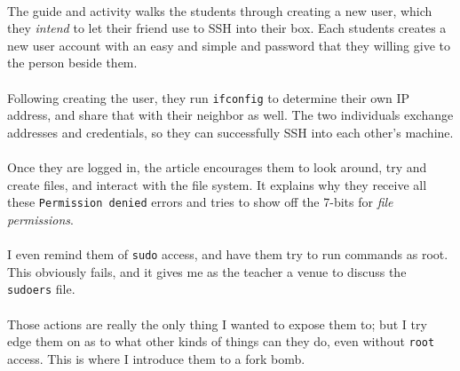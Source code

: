 \documentclass[11pt]{article}
\begin{document}
	\paragraph{} The guide and activity walks the students through creating a new user, which they \textit{intend} to let their friend use to SSH into their box. Each students creates a new user account with an easy and simple and password that they willing give to the person beside them.

	\paragraph{} Following creating the user, they run \texttt{ifconfig} to determine their own IP address, and share that with their neighbor as well. The two individuals exchange addresses and credentials, so they can successfully SSH into each other's machine.

	\paragraph{} Once they are logged in, the article encourages them to look around, try and create files, and interact with the file system. It explains why they receive all these \texttt{Permission denied} errors and tries to show off the 7-bits for \textit{file permissions}. 

	\paragraph{} I even remind them of \texttt{sudo} access, and have them try to run commands as root. This obviously fails, and it gives me as the teacher a venue to discuss the \texttt{sudoers} file. 

	\paragraph{} Those actions are really the only thing I wanted to expose them to; but I try edge them on as to what other kinds of things can they do, even without \texttt{root} access. This is where I introduce them to a fork bomb.

	\begin{center}
		\graphicspath{ {.} }
		\centering
	\end{center}
\end{document}
